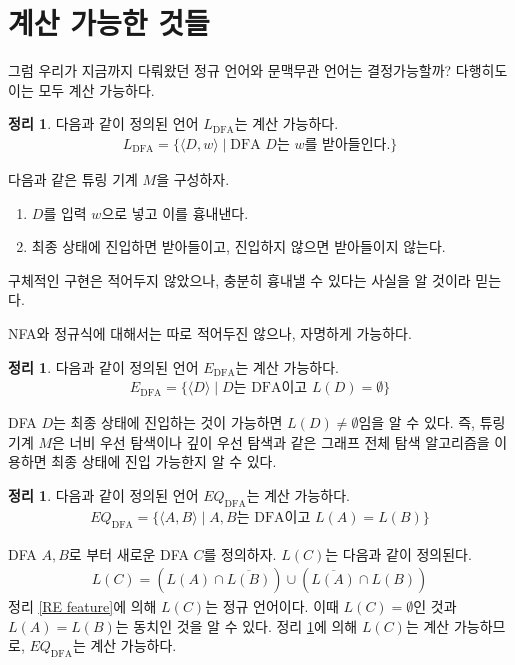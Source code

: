 \documentclass[b5paper, 11pt]{book}
\theoremstyle{definition}
\newtheorem{thm}[defn]{정리}
\newenvironment{pf*}{\pushQED{\qed}\pf}
{\popQED\endpf}
\begin{document}
\section{계산 가능한 것들}
그럼 우리가 지금까지 다뤄왔던 정규 언어와 문맥무관 언어는 결정가능할까? 
다행히도 이는 모두 계산 가능하다.
\begin{thm}
    다음과 같이 정의된 언어 $L_{\text{DFA}}$는 계산 가능하다.
    \begin{align*}
        L_{\text{DFA}} = \{ \langle D, w \rangle \;\vert\; 
        \text{DFA } D \text{는 }w\text{를 받아들인다.}\}
    \end{align*}
\end{thm}
\begin{pf*}
    다음과 같은 튜링 기계 $M$을 구성하자.
    \begin{enumerate}
        \item $D$를 입력 $w$으로 넣고 이를 흉내낸다. 
        \item 최종 상태에 진입하면 받아들이고, 진입하지 않으면 받아들이지 않는다.
    \end{enumerate}
    구체적인 구현은 적어두지 않았으나, 충분히 흉내낼 수 있다는 사실을 알 것이라 믿는다.
\end{pf*}
NFA와 정규식에 대해서는 따로 적어두진 않으나, 자명하게 가능하다.
\begin{thm}
    \label{empty DFA}
    다음과 같이 정의된 언어 $E_{\text{DFA}}$는 계산 가능하다.
    \begin{align*}
        E_{\text{DFA}} = \{ \langle D \rangle \;\vert\; 
        D\text{는 DFA이고 } L(D) = \emptyset\}
    \end{align*}
\end{thm}
\begin{pf*}
    DFA $D$는 최종 상태에 진입하는 것이 가능하면 $L(D) \neq \emptyset$임을
    알 수 있다. 즉, 튜링 기계 $M$은 너비 우선 탐색이나 깊이 우선 탐색과 같은 
    그래프 전체 탐색 알고리즘을 이용하면 최종 상태에 진입 가능한지 알 수 있다. 
\end{pf*}
\begin{thm}
    \label{DFA equiv decidable}
    다음과 같이 정의된 언어 $EQ_{\text{DFA}}$는 계산 가능하다.
    \begin{align*}
        EQ_{\text{DFA}} = \{ \langle A, B \rangle \;\vert\; 
        A, B\text{는 DFA이고 } L(A) = L(B)\}
    \end{align*}
\end{thm}
\begin{pf*}
    DFA $A, B$로 부터 새로운 DFA $C$를 정의하자. $L(C)$는
    다음과 같이 정의된다.
    \begin{align*}
        L(C) = \left( L(A) \cap \overline{L(B)} \right) \cup
        \left( \overline{L(A)} \cap L(B)\right)
    \end{align*}
    정리 \ref{RE feature}에 의해 $L(C)$는 정규 언어이다. 이때
    $L(C) = \emptyset$인 것과 $L(A) = L(B)$는 동치인 것을 알 수 있다.
    정리 \ref{empty DFA}에 의해 $L(C)$는 계산 가능하므로, $EQ_{\text{DFA}}$는 
    계산 가능하다.
\end{pf*}
\end{document}
